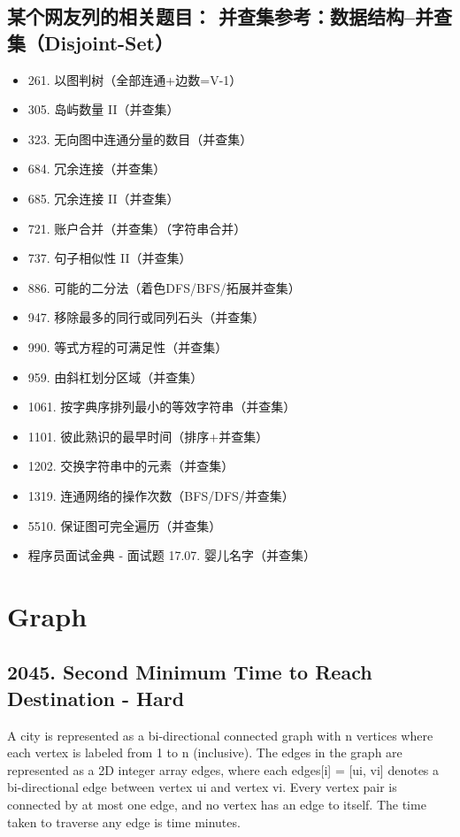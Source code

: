 \documentclass[9pt, b5paaper]{book}
\begin{document}
\section{某个网友列的相关题目： 并查集参考：数据结构–并查集（Disjoint-Set）}
\label{sec-17-9}
\begin{itemize}
\item 261. 以图判树（全部连通+边数=V-1）
\item 305. 岛屿数量 II（并查集）
\item 323. 无向图中连通分量的数目（并查集）
\item 684. 冗余连接（并查集）
\item 685. 冗余连接 II（并查集）
\item 721. 账户合并（并查集）（字符串合并）
\item 737. 句子相似性 II（并查集）
\item 886. 可能的二分法（着色DFS/BFS/拓展并查集）
\item 947. 移除最多的同行或同列石头（并查集）
\item 990. 等式方程的可满足性（并查集）
\item 959. 由斜杠划分区域（并查集）
\item 1061. 按字典序排列最小的等效字符串（并查集）
\item 1101. 彼此熟识的最早时间（排序+并查集）
\item 1202. 交换字符串中的元素（并查集）
\item 1319. 连通网络的操作次数（BFS/DFS/并查集）
\item 5510. 保证图可完全遍历（并查集）
\item 程序员面试金典 - 面试题 17.07. 婴儿名字（并查集）
\end{itemize}


\chapter{Graph}
\label{sec-18}
\section{2045. Second Minimum Time to Reach Destination - Hard}
\label{sec-18-1}
A city is represented as a bi-directional connected graph with n vertices where each vertex is labeled from 1 to n (inclusive). The edges in the graph are represented as a 2D integer array edges, where each edges[i] = [ui, vi] denotes a bi-directional edge between vertex ui and vertex vi. Every vertex pair is connected by at most one edge, and no vertex has an edge to itself. The time taken to traverse any edge is time minutes.
\end{document}

